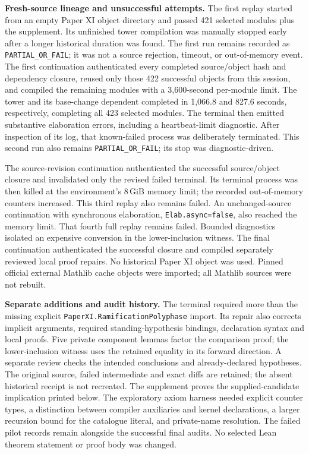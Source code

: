 \textbf{Fresh-source lineage and unsuccessful attempts.}
The first replay started from an empty Paper XI object directory and passed
421 selected modules plus the supplement. Its unfinished tower compilation
was manually stopped early after a longer historical duration was found.
The first run remains recorded as \texttt{PARTIAL\_OR\_FAIL}; it was not a
source rejection, timeout, or out-of-memory event.
The first continuation authenticated every completed source/object hash and
dependency closure, reused only those 422 successful objects from this
session, and compiled the remaining modules with a 3,600-second per-module
limit. The tower and its base-change dependent completed in
1,066.8 and 827.6 seconds, respectively, completing
all 423 selected modules. The terminal then emitted substantive elaboration
errors, including a heartbeat-limit diagnostic. After inspection of its log,
that known-failed process was deliberately terminated. This second run also
remains \texttt{PARTIAL\_OR\_FAIL}; its stop was diagnostic-driven.

The source-revision continuation authenticated the successful source/object
closure and invalidated only the revised failed terminal. Its terminal process
was then killed at the environment's 8\,GiB memory limit; the recorded
out-of-memory counters increased. This third replay also remains failed.
An unchanged-source continuation with synchronous elaboration,
\texttt{Elab.async=false}, also reached the memory limit. That fourth full
replay remains failed. Bounded diagnostics isolated an expensive conversion
in the lower-inclusion witness. The final continuation authenticated the
successful closure and compiled separately reviewed local proof repairs.
No historical Paper XI object was used. Pinned official external Mathlib cache
objects were imported; all Mathlib sources were not rebuilt.

\textbf{Separate additions and audit history.}
The terminal required more than the missing explicit
\nolinkurl{PaperXI.RamificationPolyphase} import. Its repair also corrects
implicit arguments, required standing-hypothesis bindings, declaration syntax
and local proofs. Five private component lemmas factor the comparison proof;
the lower-inclusion witness uses the retained equality in its forward direction.
A separate review checks the intended conclusions and
already-declared hypotheses. The original source, failed intermediate and
exact diffs are retained; the absent historical receipt is not recreated.
The supplement proves the supplied-candidate implication printed below.
The exploratory axiom harness needed explicit counter types, a distinction
between compiler auxiliaries and kernel declarations, a larger recursion
bound for the catalogue literal, and private-name resolution. The failed
pilot records remain alongside the successful final audits. No
selected Lean theorem statement or proof body was changed.

